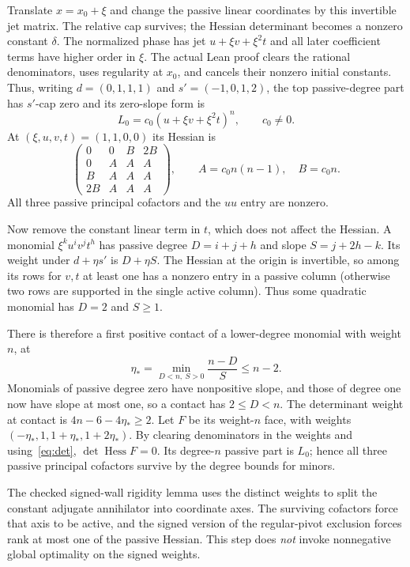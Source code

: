 \documentclass[11pt,a4paper]{article}
\newcommand{\Hess}{\operatorname{Hess}}
\begin{document}
Translate $x=x_0+\xi$ and change the passive linear coordinates by this invertible jet matrix. The relative cap survives; the Hessian determinant becomes a nonzero constant $\delta$. The normalized phase has jet $u+\xi v+\xi^2t$ and all later coefficient terms have higher order in $\xi$. The actual Lean proof clears the rational denominators, uses regularity at $x_0$, and cancels their nonzero initial constants. Thus, writing $d=(0,1,1,1)$ and $s'=(-1,0,1,2)$, the top passive-degree part has $s'$-cap zero and its zero-slope form is
\[
 L_0=c_0(u+\xi v+\xi^2t)^n,\qquad c_0\ne0.
\]
At $(\xi,u,v,t)=(1,1,0,0)$ its Hessian is
\[
 \begin{pmatrix}
 0&0&B&2B\\0&A&A&A\\B&A&A&A\\2B&A&A&A
 \end{pmatrix},
 \qquad A=c_0n(n-1),\quad B=c_0n .
\]
All three passive principal cofactors and the $uu$ entry are nonzero.

Now remove the constant linear term in $t$, which does not affect the Hessian. A monomial $\xi^ku^iv^jt^h$ has passive degree $D=i+j+h$ and slope $S=j+2h-k$. Its weight under $d+\eta s'$ is $D+\eta S$. The Hessian at the origin is invertible, so among its rows for $v,t$ at least one has a nonzero entry in a passive column (otherwise two rows are supported in the single active column). Thus some quadratic monomial has $D=2$ and $S\ge1$.

There is therefore a first positive contact of a lower-degree monomial with weight $n$, at
\[
 \eta_*=\min_{D<n,\ S>0}\frac{n-D}{S}\le n-2 .
\]
Monomials of passive degree zero have nonpositive slope, and those of degree one now have slope at most one, so a contact has $2\le D<n$. The determinant weight at contact is $4n-6-4\eta_*\ge2$. Let $F$ be its weight-$n$ face, with weights $(-\eta_*,1,1+\eta_*,1+2\eta_*)$. By clearing denominators in the weights and using~\eqref{eq:det}, $\det\Hess F=0$. Its degree-$n$ passive part is $L_0$; hence all three passive principal cofactors survive by the degree bounds for minors.

The checked signed-wall rigidity lemma  uses the distinct weights to split the constant adjugate annihilator into coordinate axes. The surviving cofactors force that axis to be active, and the signed version of the regular-pivot exclusion forces rank at most one of the passive Hessian. This step does \emph{not} invoke nonnegative global optimality on the signed weights.
\end{document}
